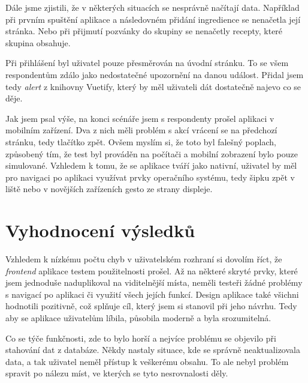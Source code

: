 Dále jsme zjistili, že v některých situacích se nesprávně načítají data. Například při prvním spuštění aplikace a následovném přidání ingredience
se nenačetla její stránka. Nebo při přijmutí pozvánky do skupiny se nenačetly recepty, které skupina obsahuje.

Při přihlášení byl uživatel pouze přesměrován na úvodní stránku. To se všem respondentům zdálo jako nedostatečné upozornění na danou událost.
Přidal jsem tedy \emph{alert} z knihovny Vuetify, který by měl uživateli dát dostatečně najevo co se děje.

Jak jsem psal výše, na konci scénáře jsem s respondenty prošel aplikaci v mobilním zařízení. Dva z nich měli problém s akcí vrácení se na předchozí stránku,
tedy tlačítko zpět. Ovšem myslím si, že toto byl falešný poplach, způsobený tím, že test byl prováděn na počítači a mobilní zobrazení bylo pouze simulované.
Vzhledem k tomu, že se aplikace tváří jako nativní, uživatel by měl pro navigaci po aplikaci využívat prvky operačního systému, tedy šipku zpět v liště nebo
v novějších zařízeních gesto ze strany displeje.

\section{Vyhodnocení výsledků}

Vzhledem k nízkému počtu chyb v uživatelském rozhraní si dovolím říct, že \emph{frontend} aplikace testem použitelnosti prošel. Až na některé
skryté prvky, které jsem jednoduše naduplikoval na viditelnější místa, neměli testeři žádné problémy s navigací po aplikaci či využití
všech jejích funkcí. Design aplikace také všichni hodnotili pozitivně, což splňuje cíl, který jsem si stanovil při jeho návrhu. Tedy aby
se aplikace uživatelům líbila, působila moderně a byla srozumitelná.

Co se týče funkčnosti, zde to bylo horší a nejvíce problému se objevilo při stahování dat z databáze. Někdy nastaly situace, kde se správně
neaktualizovala data, a tak uživatel neměl přístup k veškerému obsahu. To ale nebyl problém spravit po nálezu míst, ve kterých se tyto nesrovnalosti
děly.
